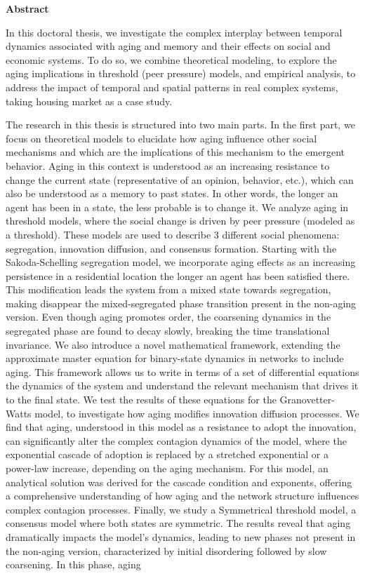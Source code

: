 \pagebreak
\thispagestyle{empty}
{}
\textbf{ \huge Abstract}

\vspace*{0.5cm}

In this doctoral thesis, we investigate the complex interplay between temporal dynamics associated with aging and memory and their effects on social and economic systems. To do so, we combine theoretical modeling, to explore the aging implications in threshold (peer pressure) models, and empirical analysis, to address the impact of temporal and spatial patterns in real complex systems, taking housing market as a case study.

The research in this thesis is structured into two main parts. In the first part, we focus on theoretical models to elucidate how aging influence other social mechanisms and which are the implications of this mechanism to the emergent behavior. Aging in this context is understood as an increasing resistance to change the current state (representative of an opinion, behavior, etc.), which can also be understood as a memory to past states. In other words, the longer an agent has been in a state, the less probable is to change it. We analyze aging in threshold models, where the social change is driven by peer pressure (modeled as a threshold). These models are used to describe 3 different social phenomena: segregation, innovation diffusion, and consensus formation. Starting with the Sakoda-Schelling segregation model, we incorporate aging effects as an increasing persistence in a residential location the longer an agent has been satisfied there. This modification leads the system from a mixed state towards segregation, making disappear the mixed-segregated phase transition present in the non-aging version. Even though aging promotes order, the coarsening dynamics in the segregated phase are found to decay slowly, breaking the time translational invariance. We also introduce a novel mathematical framework, extending the approximate master equation for binary-state dynamics in networks to include aging. This framework allows us to write in terms of a set of differential equations the dynamics of the system and understand the relevant mechanism that drives it to the final state. We test the results of these equations for the Granovetter-Watts model, to investigate how aging modifies innovation diffusion processes. We find that aging, understood in this model as a resistance to adopt the innovation, can significantly alter the complex contagion dynamics of the model, where the exponential cascade of adoption is replaced by a stretched exponential or a power-law increase, depending on the aging mechanism. For this model, an analytical solution was derived for the cascade condition and exponents, offering a comprehensive understanding of how aging and the network structure influences complex contagion processes. Finally, we study a Symmetrical threshold model, a consensus model where both states are symmetric. The results reveal that aging dramatically impacts the model's dynamics, leading to new phases not present in the non-aging version, characterized by initial disordering followed by slow coarsening. In this phase, aging 